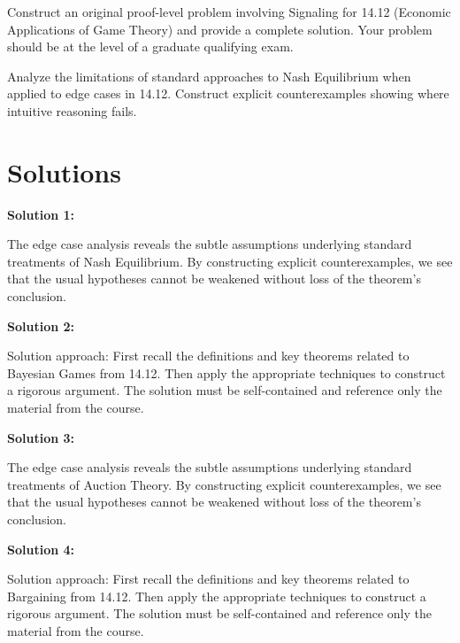 \documentclass[12pt,a4paper]{exam}
\begin{document}
\begin{questions}
\question[5]
Construct an original proof-level problem involving Signaling for 14.12 (Economic Applications of Game Theory) and provide a complete solution. Your problem should be at the level of a graduate qualifying exam.

\vspace{0.3cm}

\question[3]
Analyze the limitations of standard approaches to Nash Equilibrium when applied to edge cases in 14.12. Construct explicit counterexamples showing where intuitive reasoning fails.

\vspace{0.3cm}

\end{questions}

\newpage
\section*{Solutions}

\textbf{Solution 1:}

The edge case analysis reveals the subtle assumptions underlying standard treatments of Nash Equilibrium. By constructing explicit counterexamples, we see that the usual hypotheses cannot be weakened without loss of the theorem's conclusion.

\vspace{0.5cm}

\textbf{Solution 2:}

Solution approach: First recall the definitions and key theorems related to Bayesian Games from 14.12. Then apply the appropriate techniques to construct a rigorous argument. The solution must be self-contained and reference only the material from the course.

\vspace{0.5cm}

\textbf{Solution 3:}

The edge case analysis reveals the subtle assumptions underlying standard treatments of Auction Theory. By constructing explicit counterexamples, we see that the usual hypotheses cannot be weakened without loss of the theorem's conclusion.

\vspace{0.5cm}

\textbf{Solution 4:}

Solution approach: First recall the definitions and key theorems related to Bargaining from 14.12. Then apply the appropriate techniques to construct a rigorous argument. The solution must be self-contained and reference only the material from the course.
\end{document}
